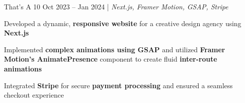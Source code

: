 \resumeSubheadings
{That's A 10 }
{Oct 2023 -- Jan 2024}
{}{}{| \textit{Next.js, Framer Motion, GSAP, Stripe}}
\resumeItemListStart
\item Developed a dynamic, \textbf{responsive website} for a creative design agency using \textbf{Next.js}
\item Implemented \textbf{complex animations using GSAP} and utilized \textbf{Framer Motion's AnimatePresence} component to create fluid \textbf{inter-route animations}
\item Integrated \textbf{Stripe} for secure \textbf{payment processing} and ensured a seamless checkout experience
\resumeItemListEnd